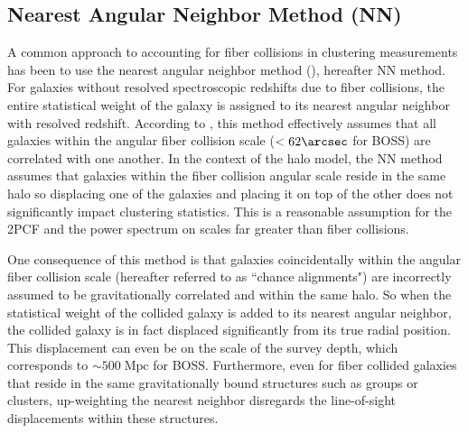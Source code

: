 \subsection{Nearest Angular Neighbor Method (NN)} \label{sec:fc_pk}
A common approach to accounting for fiber collisions in clustering measurements has been 
to use the nearest angular neighbor method (\citealt{Zehavi:2002aa, Zehavi:2005aa, 
Berlind:2006aa, Zehavi:2011aa, Anderson:2012aa}),
hereafter NN method. For galaxies without resolved spectroscopic redshifts due to fiber 
collisions, the entire statistical weight of the galaxy is assigned to its nearest angular 
neighbor with resolved redshift. 
According to \cite{Zehavi:2002aa}, this method 
effectively assumes that all galaxies within the angular fiber collision scale ($< 62 \arcsec$ for BOSS) are correlated with one another. 
In the context of the halo model, the NN method assumes that 
galaxies within the fiber collision angular scale reside in the same halo 
so displacing one of the galaxies and placing it on top of the other does 
not significantly impact clustering statistics. %
This is a reasonable assumption  
for the 2PCF and the power spectrum on scales far greater than fiber collisions.  

One consequence of this method is that galaxies coincidentally within the angular 
fiber collision scale (hereafter referred to as ``chance 
alignments") are incorrectly assumed to be gravitationally correlated and 
within the same halo. So when the statistical weight of the collided galaxy
is added to its nearest angular neighbor, the collided galaxy is in fact 
displaced significantly from its true radial position. This displacement can even 
be on the scale of the survey depth, which corresponds to $\sim500\;\mathrm{Mpc}$
for BOSS. Furthermore, even for fiber collided galaxies that reside in the 
same gravitationally bound structures such as groups or clusters, up-weighting 
the nearest neighbor disregards the line-of-sight displacements within these 
structures. 

